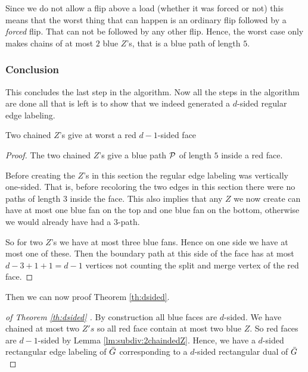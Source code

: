   Since we do not allow a flip above a load (whether it was forced or not) this means that the worst thing that can happen is an ordinary flip followed by a \emph{forced} flip. That can not be followed by any other flip. Hence, the worst case only makes chains of at most $2$ blue $Z$'s, that is a blue path of length $5$.


\subsubsection{Conclusion}
  This concludes the last step in the algorithm.
  Now all the steps in the algorithm are done all that is left is to show that we indeed generated a $d$-sided regular edge labeling.
  \begin{lemma}
    \label{lm:subdiv:2chaindedZ}
    Two chained $Z$'s give at worst a red $d-1$-sided face
  \end{lemma}
  \begin{proof}
    The two chained $Z$'s give a blue path $\P$ of length $5$ inside a red face.

    Before creating the $Z$'s in this section the regular edge labeling was vertically one-sided. That is, before recoloring the two edges in this section there were no paths of length $3$ inside the face. This also implies that any $Z$ we now create can have at most one blue fan on the top and one blue fan on the bottom, otherwise we would already have had a $3$-path.

    So for two $Z$'s we have at most three blue fans. Hence on one side we have at most one of these. Then the boundary path at this side of the face has at most $d-3 + 1 +1 =d-1$ vertices not counting the split and merge vertex of the red face.
  \end{proof}

    Then we can now proof Theorem \ref{th:dsided}.

  \begin{proof}[of Theorem \ref{th:dsided} ]
    By construction all blue faces are $d$-sided. We have chained at most two $Z's$ so all red face contain at most two blue $Z$. So red faces are $d-1$-sided by Lemma \ref{lm:subdiv:2chaindedZ}. Hence, we have a $d$-sided rectangular edge labeling of $\ext G$ corresponding to a $d$-sided rectangular dual of $\ext G$
  \end{proof}
